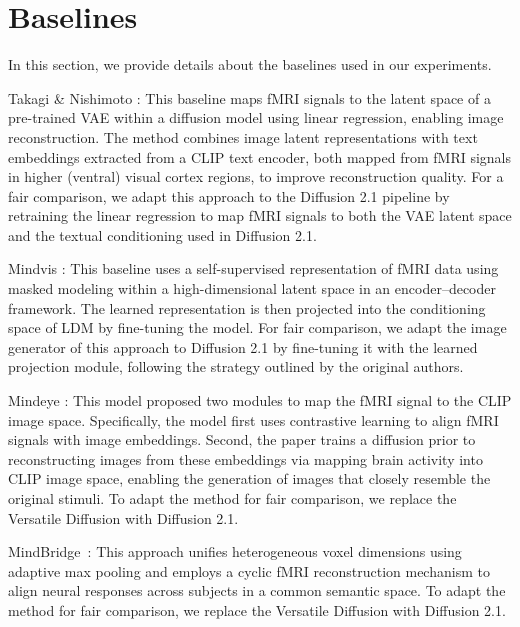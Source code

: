 \section{Baselines}
\label{app:baseline}

In this section, we provide details about the baselines used in our experiments.


\begin{itemize}
    \item Takagi \& Nishimoto \citep{takagi2023high}: This baseline maps fMRI signals to the latent space of a pre-trained VAE within a diffusion model using linear regression, enabling image reconstruction. The method combines image latent representations with text embeddings extracted from a CLIP text encoder, both mapped from fMRI signals in higher (ventral) visual cortex regions, to improve reconstruction quality. For a fair comparison, we adapt this approach to the Diffusion 2.1 pipeline by retraining the linear regression to map fMRI signals to both the VAE latent space and the textual conditioning used in Diffusion 2.1.
            
    \item Mindvis \citep{chen2023seeing}: This baseline uses a self-supervised representation of fMRI data using masked modeling within a high-dimensional latent space in an encoder–decoder framework. The learned representation is then projected into the conditioning space of LDM by fine-tuning the model. For fair comparison, we adapt the image generator of this approach to Diffusion 2.1 by fine-tuning it with the learned projection module, following the strategy outlined by the original authors.


    
    \item Mindeye \citep{scotti2023reconstructing}: This model proposed two modules to map the fMRI signal to the CLIP image space. Specifically, the model first uses contrastive learning to align fMRI signals with image embeddings. Second, the paper trains a diffusion prior to reconstructing images from these embeddings via mapping brain activity into CLIP image space, enabling the generation of images that closely resemble the original stimuli. To adapt the method for fair comparison, we replace the Versatile Diffusion with Diffusion 2.1.
    {\color{black}
    \item MindBridge~\citep{wang2024mindbridge}: This approach unifies heterogeneous voxel dimensions using adaptive max pooling and employs a cyclic fMRI reconstruction mechanism to align neural responses across subjects in a common semantic space. To adapt the method for fair comparison, we replace the Versatile Diffusion with Diffusion 2.1.

}
\end{itemize}
